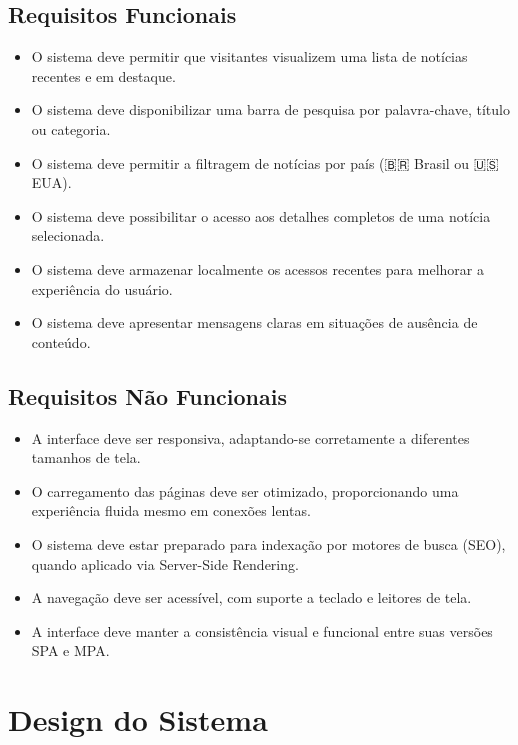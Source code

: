 \subsection{Requisitos Funcionais}
\label{subsec:requisitos-funcionais}

\begin{itemize}
  \item O sistema deve permitir que visitantes visualizem uma lista de notícias recentes e em destaque.
  \item O sistema deve disponibilizar uma barra de pesquisa por palavra-chave, título ou categoria.
  \item O sistema deve permitir a filtragem de notícias por país (🇧🇷 Brasil ou 🇺🇸 EUA).
  \item O sistema deve possibilitar o acesso aos detalhes completos de uma notícia selecionada.
  \item O sistema deve armazenar localmente os acessos recentes para melhorar a experiência do usuário.
  \item O sistema deve apresentar mensagens claras em situações de ausência de conteúdo.
\end{itemize}

\subsection{Requisitos Não Funcionais}
\label{subsec:requisitos-nao-funcionais}

\begin{itemize}
  \item A interface deve ser responsiva, adaptando-se corretamente a diferentes tamanhos de tela.
  \item O carregamento das páginas deve ser otimizado, proporcionando uma experiência fluida mesmo em conexões lentas.
  \item O sistema deve estar preparado para indexação por motores de busca (SEO), quando aplicado via Server-Side Rendering.
  \item A navegação deve ser acessível, com suporte a teclado e leitores de tela.
  \item A interface deve manter a consistência visual e funcional entre suas versões SPA e MPA.
\end{itemize}




\section{Design do Sistema}
\label{cap:design}

